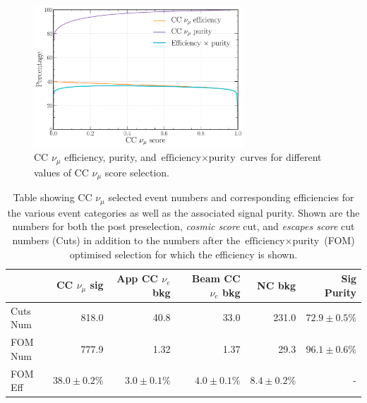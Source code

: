 \begin{figure} %
    \includegraphics[width=0.7\textwidth]{diagrams/7-results/final_numu_eff_curves.pdf}
    \caption[CC $\nu_{\mu}$ efficiency, purity, and $\text{efficiency}\times\text{purity}$ curves]
    {CC $\nu_{\mu}$ efficiency, purity, and $\text{efficiency}\times\text{purity}$ curves for
        different values of CC $\nu_{\mu}$ score selection.}
    \label{fig:final_numu_eff_curves}
\end{figure}

\begin{table}
    \begin{tabular}{lrrrrr}
                 & CC $\nu_{\mu}$ sig & App CC $\nu_{e}$ bkg & Beam CC $\nu_{e}$ bkg & NC bkg &
                 Sig Purity     \\
        \midrule
        Cuts Num & 818.0              & 40.8                 & 33.0                  & 231.0 &
        $72.9\pm0.5\%$ \\
        FOM Num  & 777.9              & 1.32                 & 1.37                  & 29.3 &
        $96.1\pm0.6\%$ \\
        \midrule
        FOM Eff  & $38.0\pm0.2\%$     & $3.0\pm0.1\%$        & $4.0\pm0.1\%$         &
        $8.4\pm0.2\%$ & -              \\
    \end{tabular}
    \caption[Table showing CC $\nu_{\mu}$ selected event numbers, efficiencies and signal purity]
    {Table showing CC $\nu_{\mu}$ selected event numbers and corresponding efficiencies for the
        various event categories as well as the associated signal purity. Shown are the numbers
        for both the post preselection, \emph{cosmic score} cut, and \emph{escapes score} cut
        numbers (Cuts) in addition to the numbers after the $\text{efficiency}\times\text{purity}$
        (FOM) optimised selection for which the efficiency is shown.}
    \label{tab:numu_selection}
\end{table}

